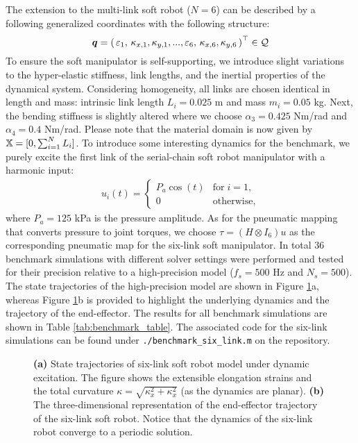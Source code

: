 %
The extension to the multi-link soft robot ($N = 6$) can be described by a following generalized coordinates with the following structure:
%
\begin{equation}
{\boldsymbol{q}} = \left(\,\varepsilon_1,\,\kappa_{x,1},\kappa_{y,1},...,\varepsilon_6,\,\kappa_{x,6},\kappa_{y,6} \, \right)^\top \in \mathcal{Q}
\end{equation}
%
To ensure the soft manipulator is self-supporting, we introduce slight variations to the hyper-elastic stiffness, link lengths, and the inertial properties of the dynamical system. Considering homogeneity, all links are chosen identical in length and mass: intrinsic link length $L_i = 0.025$ m and mass $m_i = 0.05$ kg. Next, the bending stiffness is slightly altered where we choose $\alpha_3 = 0.425$ Nm/rad and $\alpha_4 = 0.4$ Nm/rad. Please note that the material domain is now given by $\mathbb{X} = [0,\sum^N_{i=1} L_i]$. To introduce some interesting dynamics for the benchmark, we purely excite the first link of the serial-chain soft robot manipulator with a harmonic input:
%
\begin{align}
u_i(t) = \begin{cases}
P_a \cos(t) & \text{for} \; i = 1, \\
0 & \text{otherwise},
\label{eq:harm_freq}
\end{cases}
\end{align}
%
where $P_a = 125$ kPa is the pressure amplitude. As for the pneumatic mapping that converts pressure to joint torques, we choose $\tau = \left(H \otimes I_6 \right)u $ as the corresponding pneumatic map for the six-link soft manipulator. In total 36 benchmark simulations with different solver settings were performed and tested for their precision relative to a high-precision model ($f_s = 500$ Hz and $N_s = 500$). The state trajectories of the high-precision model are shown in Figure \ref{fig:7}a, whereas Figure \ref{fig:7}b is provided to highlight the underlying dynamics and the trajectory of the end-effector. The results for all benchmark simulations are shown in Table \ref{tab:benchmark_table}. The associated code for the six-link simulations can be found under \texttt{./benchmark\_six\_link.m} on the repository.

%
\begin{figure}[!t]
\centering
\caption{\textbf{(a)} State trajectories of six-link soft robot model under dynamic excitation. The figure shows the extensible elongation strains and the total curvature $\kappa = \sqrt{\kappa_x^2 + \kappa_x^2}$ (as the dynamics are planar). \textbf{(b)} The three-dimensional representation of the end-effector trajectory of the six-link soft robot. Notice that the dynamics of the six-link robot converge to a periodic solution. \label{fig:7}}
\end{figure}

